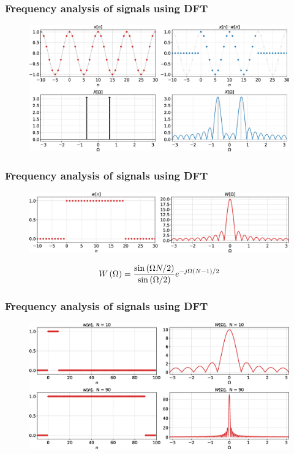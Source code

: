 \documentclass[aspectratio=169]{beamer}
\def\lp{\ensuremath\left(}
\def\rp{\ensuremath\right)}
\begin{document}
\begin{frame}[t]
  \frametitle{Frequency analysis of signals using DFT}
  \begin{figure}
  \centering
  \includegraphics[width=1\textwidth]{img/dft-leakage.eps}
  \end{figure}
\end{frame}


\begin{frame}[t]
  \frametitle{Frequency analysis of signals using DFT}
  \begin{figure}
  \centering
  \includegraphics[width=1\textwidth, left]{img/dft-rectwindow.eps}
  \end{figure}

  \[ W\lp \Omega \rp = \frac{\sin \lp \Omega N / 2\rp}{\sin \lp \Omega / 2\rp}e^{-j \Omega \lp N - 1\rp / 2} \]
\end{frame}


\begin{frame}[t]
  \frametitle{Frequency analysis of signals using DFT}
  \begin{figure}
  \centering
  \includegraphics[width=1\textwidth, left]{img/dft-rectwindows.eps}
  \end{figure}
\end{frame}
\end{document}
